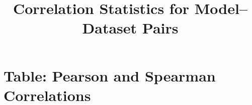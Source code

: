 \documentclass{article}
\title{Correlation Statistics for Model–Dataset Pairs}
\date{}
\begin{document}
\maketitle

\section*{Table: Pearson and Spearman Correlations}

\end{document}
